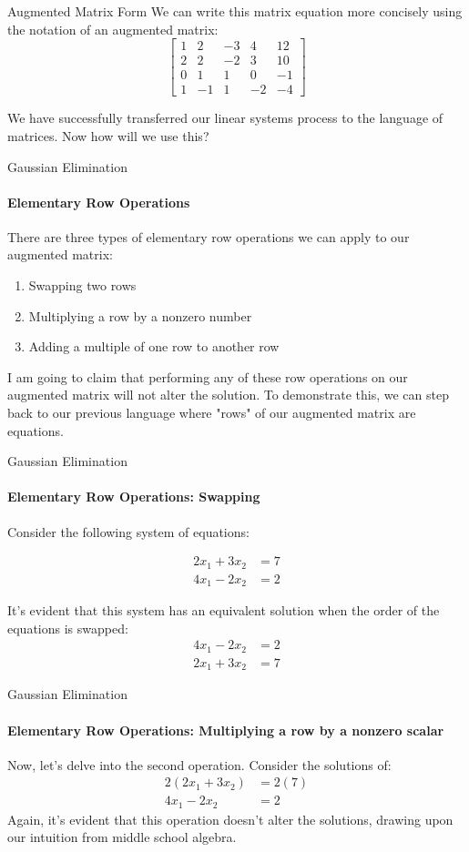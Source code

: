 \documentclass{beamer}
\begin{document}
\begin{frame}{Augmented Matrix Form}
We can write this matrix equation more concisely using the notation of an augmented matrix:
\[
\left[ 
    \begin{array}{cccc|c}
    1 & 2 & -3 & 4 & 12 \\
    2 & 2 & -2 & 3 & 10 \\
    0 & 1 & 1 & 0 & -1 \\
    1 & -1 & 1 & -2 & -4
    \end{array}
\right]
\]

We have successfully transferred our linear systems process to the language of matrices. Now how will we use this? 
\end{frame}

\begin{frame}{Gaussian Elimination}
\framesubtitle{Elementary Row Operations}
There are three types of elementary row operations we can apply to our augmented matrix:
\begin{enumerate}
    \item Swapping two rows
    \item Multiplying a row by a nonzero number
    \item Adding a multiple of one row to another row
\end{enumerate}
I am going to claim that performing any of these row operations on our augmented matrix will not alter the solution. To demonstrate this, we can step back to our previous language where "rows" of our augmented matrix are equations.
\end{frame}


\begin{frame}{Gaussian Elimination}
\framesubtitle{Elementary Row Operations: Swapping}
Consider the following system of equations:

\begin{align*}
    2x_1 + 3x_2 &= 7 \\
    4x_1 - 2x_2 &= 2
\end{align*}

It's evident that this system has an equivalent solution when the order of the equations is swapped:
\begin{align*}
    4x_1 - 2x_2 &= 2 \\
    2x_1 + 3x_2 &= 7
\end{align*}
\end{frame}

\begin{frame}{Gaussian Elimination}
\framesubtitle{Elementary Row Operations: Multiplying a row by a nonzero scalar}
Now, let's delve into the second operation. Consider the solutions of:
\begin{align*}
    2(2x_1 + 3x_2) &= 2(7) \\
    4x_1 - 2x_2 &= 2
\end{align*}
Again, it's evident that this operation doesn't alter the solutions, drawing upon our intuition from middle school algebra.
\end{frame}
\end{document}
